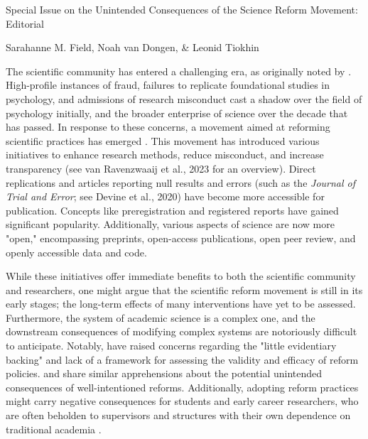 \documentclass[authordate, editorial,noabstract]{jote-new-article}
\author[1]{\mbox{Sarahanne Field\orcid{0000-0001-7874-1261}}}
\affil[1]{University of Groningen}
\author[2]{\mbox{Noah van Dongen\orcid{0000-0003-0387-7388}}}
\affil[2]{University of Amsterdam}
\author[3]{\mbox{Leonid Tiokhin\orcid{0000-0001-7333-0383}}}
\affil[3]{IG\&H: Utrecht}
\begin{document}
\begin{frontmatter}
  \maketitle
  \begin{abstract}
    \printabstracttext
  \end{abstract}
\end{frontmatter}


	Special Issue on the Unintended Consequences of the Science Reform Movement: Editorial



	Sarahanne M. Field, Noah van Dongen, \& Leonid Tiokhin







	The scientific community has entered a challenging era, as originally noted by \textcite{Wagenmakers2012}. High-profile instances of fraud, failures to replicate foundational studies in psychology, and admissions of research misconduct \parencites[e.g.,][]{John2012} cast a shadow over the field of psychology initially, and the broader enterprise of science over the decade that has passed. In response to these concerns, a movement aimed at reforming scientific practices has emerged \parencites{Field2022}{Munafo2017}{Spellman2018}. This movement has introduced various initiatives to enhance research methods, reduce misconduct, and increase transparency (see van Ravenzwaaij et al., 2023 for an overview). Direct replications and articles reporting null results and errors (such as the\emph{ Journal of Trial and Error}; see Devine et al., 2020) have become more accessible for publication. Concepts like preregistration and registered reports have gained significant popularity. Additionally, various aspects of science are now more "open," encompassing preprints, open-access publications, open peer review, and openly accessible data and code.



	While these initiatives offer immediate benefits to both the scientific community and researchers, one might argue that the scientific reform movement is still in its early stages; the long-term effects of many interventions have yet to be assessed. Furthermore, the system of academic science is a complex one, and the downstream consequences of modifying complex systems are notoriously difficult to anticipate. Notably, \textcite{Devezer2021} have raised concerns regarding the "little evidentiary backing" and lack of a framework for assessing the validity and efficacy of reform policies. \textcite{Ioannidis2014} and \textcite{Tiokhin2021} share similar apprehensions about the potential unintended consequences of well-intentioned reforms. Additionally, adopting reform practices might carry negative consequences for students and early career researchers, who are often beholden to supervisors and structures with their own dependence on traditional academia \parencites{Field2023}.
\end{document}
